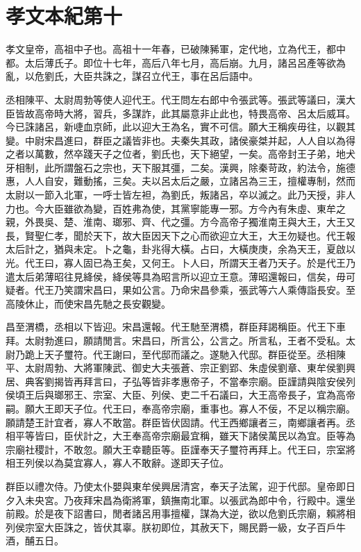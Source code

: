 \chapter{孝文本紀第十}

孝文皇帝，高祖中子也。高祖十一年春，已破陳豨軍，定代地，立為代王，都中都。太后薄氏子。即位十七年，高后八年七月，高后崩。九月，諸呂呂產等欲為亂，以危劉氏，大臣共誅之，謀召立代王，事在呂后語中。

丞相陳平、太尉周勃等使人迎代王。代王問左右郎中令張武等。張武等議曰，漢大臣皆故高帝時大將，習兵，多謀詐，此其屬意非止此也，特畏高帝、呂太后威耳。今已誅諸呂，新啑血京師，此以迎大王為名，實不可信。願大王稱疾毋往，以觀其變。中尉宋昌進曰，群臣之議皆非也。夫秦失其政，諸侯豪桀并起，人人自以為得之者以萬數，然卒踐天子之位者，劉氏也，天下絕望，一矣。高帝封王子弟，地犬牙相制，此所謂盤石之宗也，天下服其彊，二矣。漢興，除秦苛政，約法令，施德惠，人人自安，難動搖，三矣。夫以呂太后之嚴，立諸呂為三王，擅權專制，然而太尉以一節入北軍，一呼士皆左袒，為劉氏，叛諸呂，卒以滅之。此乃天授，非人力也。今大臣雖欲為變，百姓弗為使，其黨寧能專一邪。方今內有朱虛、東牟之親，外畏吳、楚、淮南、瑯邪、齊、代之彊。方今高帝子獨淮南王與大王，大王又長，賢聖仁孝，聞於天下，故大臣因天下之心而欲迎立大王，大王勿疑也。代王報太后計之，猶與未定。卜之龜，卦兆得大橫。占曰，大橫庚庚，余為天王，夏啟以光。代王曰，寡人固已為王矣，又何王。卜人曰，所謂天王者乃天子。於是代王乃遣太后弟薄昭往見絳侯，絳侯等具為昭言所以迎立王意。薄昭還報曰，信矣，毋可疑者。代王乃笑謂宋昌曰，果如公言。乃命宋昌參乘，張武等六人乘傳詣長安。至高陵休止，而使宋昌先馳之長安觀變。

昌至渭橋，丞相以下皆迎。宋昌還報。代王馳至渭橋，群臣拜謁稱臣。代王下車拜。太尉勃進曰，願請閒言。宋昌曰，所言公，公言之。所言私，王者不受私。太尉乃跪上天子璽符。代王謝曰，至代邸而議之。遂馳入代邸。群臣從至。丞相陳平、太尉周勃、大將軍陳武、御史大夫張蒼、宗正劉郢、朱虛侯劉章、東牟侯劉興居、典客劉揭皆再拜言曰，子弘等皆非孝惠帝子，不當奉宗廟。臣謹請與陰安侯列侯頃王后與瑯邪王、宗室、大臣、列侯、吏二千石議曰，大王高帝長子，宜為高帝嗣。願大王即天子位。代王曰，奉高帝宗廟，重事也。寡人不佞，不足以稱宗廟。願請楚王計宜者，寡人不敢當。群臣皆伏固請。代王西鄉讓者三，南鄉讓者再。丞相平等皆曰，臣伏計之，大王奉高帝宗廟最宜稱，雖天下諸侯萬民以為宜。臣等為宗廟社稷計，不敢忽。願大王幸聽臣等。臣謹奉天子璽符再拜上。代王曰，宗室將相王列侯以為莫宜寡人，寡人不敢辭。遂即天子位。

群臣以禮次侍。乃使太仆嬰與東牟侯興居清宮，奉天子法駕，迎于代邸。皇帝即日夕入未央宮。乃夜拜宋昌為衛將軍，鎮撫南北軍。以張武為郎中令，行殿中。還坐前殿。於是夜下詔書曰，閒者諸呂用事擅權，謀為大逆，欲以危劉氏宗廟，賴將相列侯宗室大臣誅之，皆伏其辜。朕初即位，其赦天下，賜民爵一級，女子百戶牛酒，酺五日。

